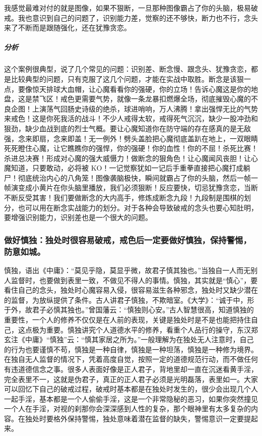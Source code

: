 \begin{case}[练习断念]
    我感觉最难对付的就是图像，如果不狠断，一旦那种图像霸占了你的头脑，极易破戒。我也意识到自己的问题了，识别能力差，觉察的还不够快，断力也不行，念头来了不断而是跟随强化，还在犹豫贪恋。
    \subparagraph{分析} 这个案例很典型，说了几个常见的问题：识别差、断念慢、跟念头、犹豫贪恋，都是比较典型的问题，只有克服了这几个问题，才能在实战中取胜。断念是该狠一点，要像惊天排球大血帽，让心魔看看你的强硬，你的立场！告诉心魔这是你的地盘，这是禁飞区！戒色更需要气势，就像一条龙暴扣燃爆全场，彻底摧毁心魔的不良企图！上演荡气回肠史诗级的绝杀，球进哨响，万人沸腾！拿出强悍无比的气势来戒色！这是你死我活的战斗！不少人戒得太软，戒得死气沉沉，缺少一股冲劲和狠劲，缺少血战到底的烈士气概。要让心魔知道你在防守端的存在感真的是无敌强，念来即扇，念来即盖！无一例外！劈头盖脸把心魔彻底盖趴在地上，一双眼睛死死瞪住心魔，让它瞧瞧你的强悍，你的强硬！你的血性！你的不屈！杀死比赛！杀进总决赛！形成对心魔的强大威慑力！做断念的狠角色！让心魔闻风丧胆！让心魔知道，只要敢动，必将被 KO！一记觉察犹如一记后手重拳直接把心魔打成躺尸！彻底统治内心的八角笼！图像袭脑极快，瞬间就霸占了你的头脑，然后一帧一帧演变成小黄片在你头脑里播放，我们必须狠断！反应要快，切忌犹豫贪恋，当断不断反受其害！我们要做断念的大内高手，修炼成断念九段！九段制是围棋的划分，也可以用在断念实战能力的划分。对于各种会导致破戒的念头也要心知肚明，要增强识别能力，识别差也是一个很大的问题。
\end{case}

\subsubsection{做好慎独：独处时很容易破戒，戒色后一定要做好慎独，保持警惕，防意如城。}

慎独，语出《中庸》：“莫见乎隐，莫显乎微，故君子慎其独也。”当独自一人而无别人监督时，也要做到表里一致，不做见不得人的事情。慎独，其实就是“慎心”，要看住自己的念头，独处时心魔容易入侵，很容易滋生各种邪念，独处时又缺少潜在的监督，为放纵提供了条件。古人讲君子慎独，不欺暗室。《大学》：“诚于中，形于外，故君子必慎其独也。”曾国藩云：“慎独则心安。”古人智慧很高，知道慎独的重要性，一个人的修养不仅仅是在人前的表现，关键是独处时是不是也能把持住自己，这点极为重要。慎独讲究个人道德水平的修养，看重个人品行的操守，东汉郑玄注《中庸》“慎独”云：“慎其家居之所为。”一般理解为在独处无人注意时，自己的行为也要谨慎不苟，慎独是一种自律，慎独是一种坦荡，慎独是一种修为境界。在独自无人监督的情况下，凭着高度自觉，按照一定的道德规范行动，而不做任何有违道德信念之事。很多人表面好像是正人君子，背地里却一直在沉迷看黄手淫，完全表里不一，这就是伪君子，真正的正人君子必须是光明磊落，表里如一。大家可以回忆下自己的破戒过程，破戒时基本都是在独处时发生的，很少会出现几个人一起手淫，基本都是一个人偷偷手淫，这是一个非常隐秘的恶习，如果你突然撞见一个人在手淫，对视的刹那你会深深感到人性的复杂，那个眼神里有太多复杂的内容。在独处时要格外保持警惕，独处意味着潜在监督的缺失，警惕意识一定要提起来。

